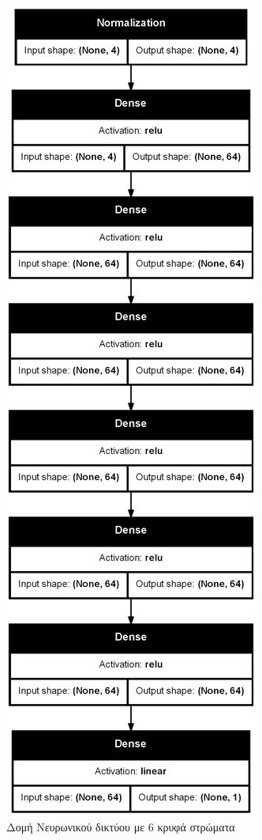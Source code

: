 \begin{figure}[H]
\begin{minipage}{0.4\textwidth}
    \end{minipage}
  \hfill
  \begin{minipage}{0.4\textwidth}
      \centering
      \includegraphics[width=\linewidth]{images/Results/Neural Net/6HL/structure.png}
      \caption{Δομή Νευρωνικού δικτύου με $6$ κρυφά στρώματα}
      \label{fig:Neural Network Structure with 6 Hidden layer}

  \end{minipage}
\end{figure}



